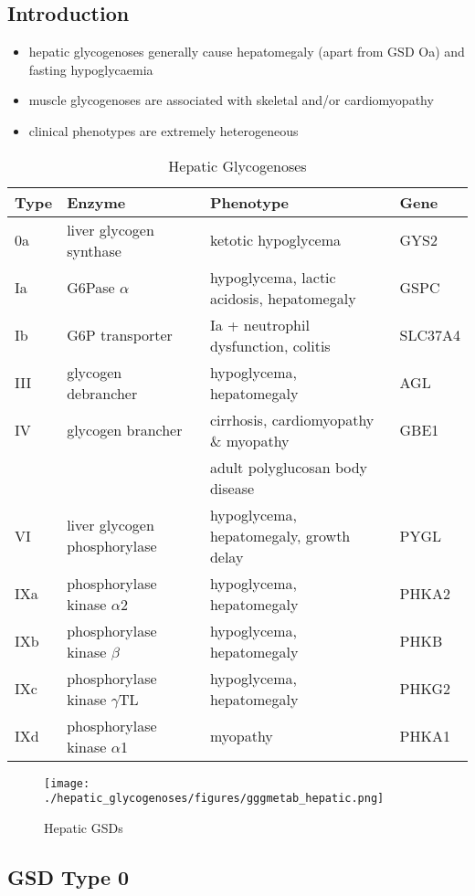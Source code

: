 \documentclass{scrartcl}
\begin{document}
\subsection{Introduction}
\label{sec:org7744f57}
\begin{itemize}
\item hepatic glycogenoses generally cause hepatomegaly (apart from GSD
Oa) and fasting hypoglycaemia
\item muscle glycogenoses are associated with skeletal and/or
cardiomyopathy
\item clinical phenotypes are extremely heterogeneous
\end{itemize}
\begin{table}[htbp]
\caption{\label{tab:org4866602}
Hepatic Glycogenoses}
\centering
\begin{tabular}{llll}
Type & Enzyme & Phenotype & Gene\\
\hline
0a & liver glycogen synthase & ketotic hypoglycema & GYS2\\
Ia & G6Pase \(\alpha\) & hypoglycema, lactic acidosis, hepatomegaly & GSPC\\
Ib & G6P transporter & Ia + neutrophil dysfunction, colitis & SLC37A4\\
III & glycogen debrancher & hypoglycema, hepatomegaly & AGL\\
IV & glycogen brancher & cirrhosis, cardiomyopathy \& myopathy & GBE1\\
 &  & adult polyglucosan body disease & \\
VI & liver glycogen phosphorylase & hypoglycema, hepatomegaly, growth delay & PYGL\\
\hline
IXa & phosphorylase kinase \(\alpha\)2 & hypoglycema, hepatomegaly & PHKA2\\
IXb & phosphorylase kinase \(\beta\) & hypoglycema, hepatomegaly & PHKB\\
IXc & phosphorylase kinase \(\gamma\)TL & hypoglycema, hepatomegaly & PHKG2\\
IXd & phosphorylase kinase \(\alpha\)1 & myopathy & PHKA1\\
\end{tabular}
\end{table}

\begin{figure}[htbp]
\centering
\texttt{[image: ./hepatic\_glycogenoses/figures/gggmetab\_hepatic.png]}
\caption{\label{fig:orga925dd6}
Hepatic GSDs}
\end{figure}

\subsection{GSD Type 0}
\label{sec:org444caaf}
\end{document}
